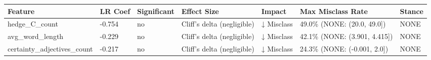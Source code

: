 \begin{tabular}{lllllll}
\toprule
Feature & LR Coef & Significant & Effect Size & Impact & Max Misclass Rate & Stance \\
\midrule
hedge\_C\_count & -0.754 & no & Cliff's delta (negligible) & ↓ Misclass & 49.0\% (NONE: (20.0, 49.0]) & NONE \\
avg\_word\_length & -0.229 & no & Cliff's delta (negligible) & ↓ Misclass & 42.1\% (NONE: (3.901, 4.415]) & NONE \\
certainty\_adjectives\_count & -0.217 & no & Cliff's delta (negligible) & ↓ Misclass & 24.3\% (NONE: (-0.001, 2.0]) & NONE \\
\bottomrule
\end{tabular}
